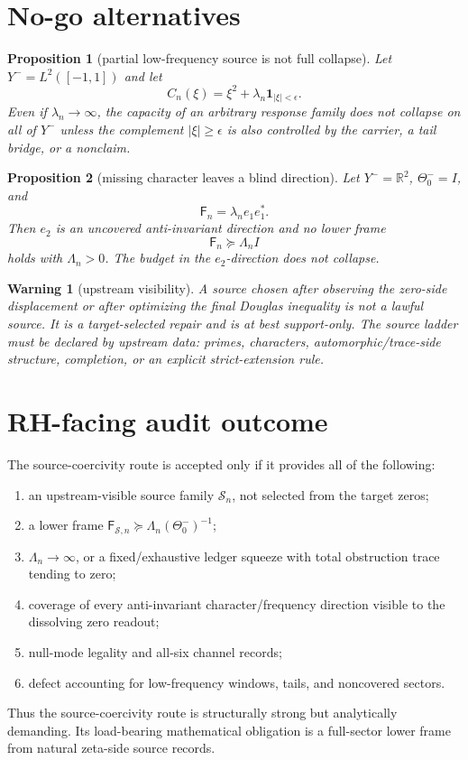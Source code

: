 \documentclass[11pt]{article}
\newtheorem{proposition}{Proposition}
\newtheorem{warning}{Warning}
\newcommand{\F}{\mathsf F}
\newcommand{\Y}{Y^-}
\begin{document}
\section{No-go alternatives}

\begin{proposition}[partial low-frequency source is not full collapse]
Let \(\Y=L^2([-1,1])\) and let
\[
  C_n(\xi)=\xi^2+\lambda_n\mathbf 1_{|\xi|<\epsilon}.
\]
Even if \(\lambda_n\to\infty\), the capacity of an arbitrary response family does not collapse on all of \(\Y\) unless the complement \(|\xi|\ge\epsilon\) is also controlled by the carrier, a tail bridge, or a nonclaim.
\end{proposition}

\begin{proposition}[missing character leaves a blind direction]
Let \(\Y=\mathbb R^2\), \(\Theta_0^-=I\), and
\[
  \F_n=\lambda_n e_1e_1^*.
\]
Then \(e_2\) is an uncovered anti-invariant direction and no lower frame
\[
  \F_n\succeq \Lambda_n I
\]
holds with \(\Lambda_n>0\).  The budget in the \(e_2\)-direction does not collapse.
\end{proposition}

\begin{warning}[upstream visibility]
A source chosen after observing the zero-side displacement or after optimizing the final Douglas inequality is not a lawful source.  It is a target-selected repair and is at best support-only.  The source ladder must be declared by upstream data: primes, characters, automorphic/trace-side structure, completion, or an explicit strict-extension rule.
\end{warning}

\section{RH-facing audit outcome}

The source-coercivity route is accepted only if it provides all of the following:
\begin{enumerate}[label=(S\arabic*)]
\item an upstream-visible source family \(\mathcal S_n\), not selected from the target zeros;
\item a lower frame \(\F_{\mathcal S,n}\succeq\Lambda_n(\Theta_0^-)^{-1}\);
\item \(\Lambda_n\to\infty\), or a fixed/exhaustive ledger squeeze with total obstruction trace tending to zero;
\item coverage of every anti-invariant character/frequency direction visible to the dissolving zero readout;
\item null-mode legality and all-six channel records;
\item defect accounting for low-frequency windows, tails, and noncovered sectors.
\end{enumerate}

Thus the source-coercivity route is structurally strong but analytically demanding.  Its load-bearing mathematical obligation is a full-sector lower frame from natural zeta-side source records.
\end{document}
